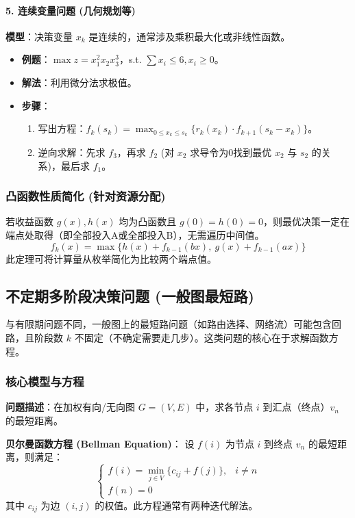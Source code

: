 \documentclass[a4paper,12pt]{ctexart} %
\begin{document}
	\paragraph{5. 连续变量问题 (几何规划等)}
	\textbf{模型}：决策变量 $x_k$ 是连续的，通常涉及乘积最大化或非线性函数。
	\begin{itemize}
		\item \textbf{例题}：$\max z = x_1^2 x_2 x_3^3$，s.t. $\sum x_i \le 6, x_i \ge 0$。
		\item \textbf{解法}：利用微分法求极值。
		\item \textbf{步骤}：
		\begin{enumerate}
			\item 写出方程：$f_k(s_k) = \max_{0 \le x_k \le s_k} \{ r_k(x_k) \cdot f_{k+1}(s_k - x_k) \}$。
			\item 逆向求解：先求 $f_3$，再求 $f_2$ (对 $x_2$ 求导令为0找到最优 $x_2$ 与 $s_2$ 的关系)，最后求 $f_1$。
		\end{enumerate}
	\end{itemize}
	
	\subsubsection{凸函数性质简化 (针对资源分配)}
	若收益函数 $g(x), h(x)$ 均为凸函数且 $g(0)=h(0)=0$，则最优决策一定在端点处取得（即全部投入A或全部投入B），无需遍历中间值。
	\[
	f_k(x) = \max \{ h(x) + f_{k-1}(bx), \ g(x) + f_{k-1}(ax) \}
	\]
	此定理可将计算量从枚举简化为比较两个端点值。
	
	\subsection{不定期多阶段决策问题 (一般图最短路)}
	
	与有限期问题不同，一般图上的最短路问题（如路由选择、网络流）可能包含回路，且阶段数 $k$ 不固定（不确定需要走几步）。这类问题的核心在于求解函数方程。
	
	\subsubsection{核心模型与方程}
	\textbf{问题描述}：在加权有向/无向图 $G=(V,E)$ 中，求各节点 $i$ 到汇点（终点）$v_n$ 的最短距离。
	
	\textbf{贝尔曼函数方程 (Bellman Equation)}：
	设 $f(i)$ 为节点 $i$ 到终点 $v_n$ 的最短距离，则满足：
	\begin{equation}
		\begin{cases} 
			f(i) = \min_{j \in V} \{ c_{ij} + f(j) \}, & i \neq n \\
			f(n) = 0 
		\end{cases}
	\end{equation}
	其中 $c_{ij}$ 为边 $(i,j)$ 的权值。此方程通常有两种迭代解法。
	
\end{document}
